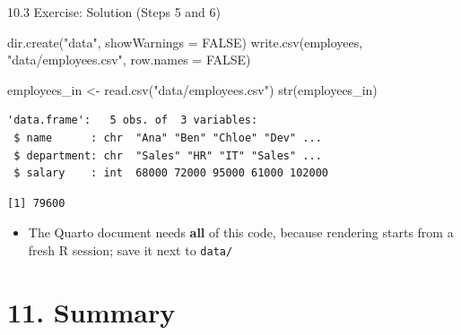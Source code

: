 \documentclass[
  ignorenonframetext,
  aspectratio=169,
]{beamer}
\newenvironment{Shaded}{\begin{snugshade}}{\end{snugshade}}
\newcommand{\AttributeTok}[1]{\textcolor[rgb]{0.40,0.45,0.13}{#1}}
\newcommand{\ConstantTok}[1]{\textcolor[rgb]{0.56,0.35,0.01}{#1}}
\newcommand{\FunctionTok}[1]{\textcolor[rgb]{0.28,0.35,0.67}{#1}}
\newcommand{\NormalTok}[1]{\textcolor[rgb]{0.00,0.23,0.31}{#1}}
\newcommand{\OtherTok}[1]{\textcolor[rgb]{0.00,0.23,0.31}{#1}}
\newcommand{\SpecialCharTok}[1]{\textcolor[rgb]{0.37,0.37,0.37}{#1}}
\newcommand{\StringTok}[1]{\textcolor[rgb]{0.13,0.47,0.30}{#1}}
\providecommand{\tightlist}{%
  \setlength{\itemsep}{0pt}\setlength{\parskip}{0pt}}
\begin{document}
\begin{frame}[fragile]{10.3 Exercise: Solution (Steps 5 and 6)}
\protect{}\label{exercise-solution-steps-5-and-6}
\begin{Shaded}
\begin{Highlighting}[]
\FunctionTok{dir.create}\NormalTok{(}\StringTok{"data"}\NormalTok{, }\AttributeTok{showWarnings =} \ConstantTok{FALSE}\NormalTok{)}
\FunctionTok{write.csv}\NormalTok{(employees, }\StringTok{"data/employees.csv"}\NormalTok{, }\AttributeTok{row.names =} \ConstantTok{FALSE}\NormalTok{)}

\NormalTok{employees\_in }\OtherTok{\textless{}{-}} \FunctionTok{read.csv}\NormalTok{(}\StringTok{"data/employees.csv"}\NormalTok{)}
\FunctionTok{str}\NormalTok{(employees\_in)}
\end{Highlighting}
\end{Shaded}

\begingroup\tiny\color{darkgray}

\begin{verbatim}
'data.frame':   5 obs. of  3 variables:
 $ name      : chr  "Ana" "Ben" "Chloe" "Dev" ...
 $ department: chr  "Sales" "HR" "IT" "Sales" ...
 $ salary    : int  68000 72000 95000 61000 102000
\end{verbatim}

\endgroup

\begin{Shaded}
\end{Shaded}

\begingroup\tiny\color{darkgray}

\begin{verbatim}
[1] 79600
\end{verbatim}

\endgroup

\begin{itemize}
\tightlist
\item
  The Quarto document needs \textbf{all} of this code, because rendering
  starts from a fresh R session; save it next to \texttt{data/}
\end{itemize}
\end{frame}

\section{11. Summary}\label{sec-summary}
\end{document}
